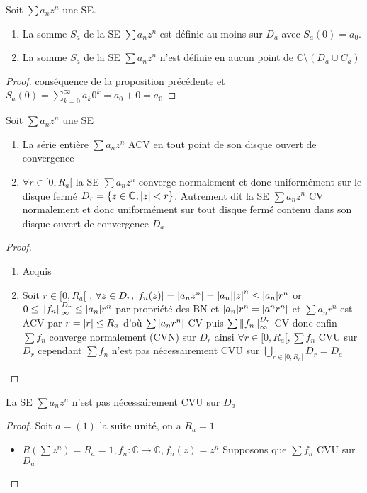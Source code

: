 \documentclass[11pt,hidelinks]{book}
\theoremstyle{mytheoremstyle}
\theoremstyle{mytheoremstyle}
\theoremstyle{mytheoremstyle}
\theoremstyle{mytheoremstyle}
\theoremstyle{mytheoremstyle}
\theoremstyle{mytheoremstyle}
\theoremstyle{mytheoremstyle}
\theoremstyle{mytheoremstyle}
\theoremstyle{myproblemstyle}
\def\mbb#1{\mathbb{#1}}
\def\bC{\mbb{C}}
\def\se{\sum a_n z^n}
\newcommand{\func}[3]{#1\colon#2\to#3}
\newcommand{\parenth}[1]{\left(#1\right)}
\begin{document}
\begin{adjustwidth}{-2em}{-1em}
    \begin{prop}
        Soit $\se$ une SE.
        \begin{enumerate} 
        \item La somme $S_a$ de la SE $\se$ est définie au moins sur $D_a$ avec $S_a(0) = a_0$.
        \item La somme $S_a$ de la SE $\se$ n'est définie en aucun point de $\bC \setminus (D_a \cup C_a)$
        \end{enumerate}
        \begin{proof}
            conséquence de la proposition précédente et
            $S_a(0) = \sum_{k=0}^{\infty} a_k 0^k = a_0 + 0 = a_0$
        \end{proof}
    \end{prop}
    \begin{theorem}
        Soit $\se$ une SE 
        \begin{enumerate} 
        \item La série entière $\se$ ACV en tout point de son 
        disque ouvert de convergence 
        \item $\forall r \in [0,R_a[$ la SE $\se$ converge normalement et 
        donc uniformément sur le disque fermé $D_r = \{z \in \bC, \abs{z} < r\}$.
        Autrement dit la SE $\se$ CV normalement et donc uniformément sur tout 
        disque fermé contenu dans son disque ouvert de convergence $D_a$
        \end{enumerate}
        \begin{proof}
            \begin{enumerate}
            \item Acquis
             
            \item Soit $r \in [0,R_a[$ , $\forall z \in D_r, 
            \abs{f_n(z)} = \abs{a_n z^n} = \abs{a_n} \abs{z}^n \leq \abs{a_n} r^n$
            or $0 \leq \norm{f_n}^{D_r}_{\infty} \leq \abs{a_n} r^n$ par propriété des BN
            et $\abs{a_n}r^n = \abs{a^n r^n}$ et $\sum a_n r^n$ est ACV par $r = \abs{r} \leq R_a$
            d'où $\sum \abs{a_n r^n}$ CV puis $\sum \norm{f_n}^{D_r}_{\infty}$ CV donc enfin 
            $\sum f_n$ converge normalement (CVN) sur $D_r$
            ainsi $\forall r \in [0,R_a[, \sum f_n$ CVU sur $D_r$ 
            cependant $\sum f_n$ n'est pas nécessairement CVU sur $\bigcup_{r \in [0,R_a[} D_r = D_a$
            \end{enumerate}
        \end{proof}
    \end{theorem}
    \begin{rmq}
        La SE $\se$ n'est pas nécessairement CVU sur $D_a$
        \begin{proof}
            Soit $a = (1)$ la suite unité, on a $R_a = 1$ 
            \begin{itemize}[label=$\circ$] 
            \item $R\parenth{\sum z^n} = R_a = 1, \func{f_n}{\bC}{\bC}, f_n(z) = z^n$ \newline 
            Supposons que $\sum f_n$ CVU sur $D_a$ 
             

\end{itemize}
\end{proof}
\end{rmq}
\end{adjustwidth}
\end{document}
